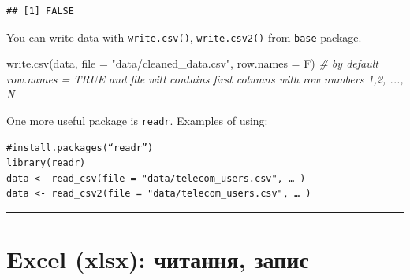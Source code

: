 \documentclass[
]{book}
\newenvironment{Shaded}{\begin{snugshade}}{\end{snugshade}}
\newcommand{\AttributeTok}[1]{\textcolor[rgb]{0.77,0.63,0.00}{#1}}
\newcommand{\CommentTok}[1]{\textcolor[rgb]{0.56,0.35,0.01}{\textit{#1}}}
\newcommand{\FunctionTok}[1]{\textcolor[rgb]{0.00,0.00,0.00}{#1}}
\newcommand{\NormalTok}[1]{#1}
\newcommand{\OtherTok}[1]{\textcolor[rgb]{0.56,0.35,0.01}{#1}}
\newcommand{\SpecialCharTok}[1]{\textcolor[rgb]{0.00,0.00,0.00}{#1}}
\newcommand{\StringTok}[1]{\textcolor[rgb]{0.31,0.60,0.02}{#1}}
\begin{document}
\begin{Shaded}
\end{Shaded}

\begin{verbatim}
## [1] FALSE
\end{verbatim}

You can write data with \texttt{write.csv()}, \texttt{write.csv2()} from \texttt{base} package.

\begin{Shaded}
\begin{Highlighting}[]
\FunctionTok{write.csv}\NormalTok{(data, }\AttributeTok{file =} \StringTok{"data/cleaned\_data.csv"}\NormalTok{, }\AttributeTok{row.names =}\NormalTok{ F)}
\CommentTok{\# by default row.names = TRUE and file will contains first columns with row numbers 1,2, ..., N}
\end{Highlighting}
\end{Shaded}

One more useful package is \texttt{readr}. Examples of using:

\begin{verbatim}
#install.packages(“readr”)
library(readr)
data <- read_csv(file = "data/telecom_users.csv", … )
data <- read_csv2(file = "data/telecom_users.csv", … )
\end{verbatim}

\begin{center}\rule{0.5\linewidth}{0.5pt}\end{center}

\hypertarget{chapter44}{%
\section{Excel (xlsx): читання, запис}\label{chapter44}}
\end{document}
